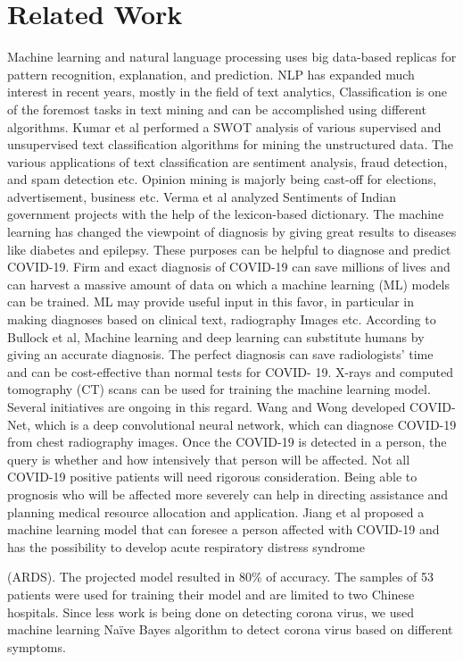 \documentclass[conference]{IEEEtran}
\begin{document}
\section{Related Work}
Machine learning and natural language processing uses big data-based replicas for pattern recognition, explanation, and prediction. NLP has expanded much interest in recent years, mostly in the field of text analytics, Classification is one of the foremost tasks in text mining and can be accomplished using different algorithms. Kumar et al performed a SWOT analysis of various supervised and unsupervised text classification algorithms for mining the unstructured data\cite{kumar2020text}. The various applications of text classification are sentiment analysis, fraud detection, and spam detection etc. Opinion mining is majorly being cast-off for elections, advertisement, business etc. Verma et al analyzed Sentiments of Indian government projects with the help of the lexicon-based dictionary\cite{verma2019twitter}. The machine learning has changed the viewpoint of diagnosis by giving great results to diseases like diabetes and epilepsy. These purposes can be helpful to diagnose and predict COVID-19. Firm and exact diagnosis of COVID-19 can save millions of lives and can harvest a massive amount of data on which a machine learning (ML) models can be trained. ML may provide useful input in this favor, in particular in making diagnoses based on clinical text, radiography Images etc. According to Bullock et al, Machine learning and deep learning can substitute humans by giving an accurate diagnosis. The perfect diagnosis can save radiologists’ time and can be cost-effective than normal tests for COVID-
19\cite{bullock2020mapping}. X-rays and computed tomography (CT) scans can be used for training the machine learning model. Several initiatives are ongoing in this regard. Wang and Wong developed COVID-Net, which is a deep convolutional neural network, which can diagnose COVID-19 from chest radiography images\cite{wang2020covid}. Once the COVID-19 is detected in a person, the query is whether and how intensively that person will be affected. Not all COVID-19 positive patients will need rigorous consideration. Being able to prognosis who will be affected more severely can help in directing assistance and planning medical resource allocation and application. Jiang et al proposed a machine learning model that can foresee a person affected with COVID-19 and has the possibility to develop   acute   respiratory distress syndrome
 
(ARDS)\cite{xu2021risk}. The projected model resulted in 80\% of accuracy. The samples of 53 patients were used for training their model and are limited to two Chinese hospitals. Since less work is being done on detecting corona virus, we used machine learning Naïve Bayes algorithm to detect corona virus based on different symptoms.
\end{document}
